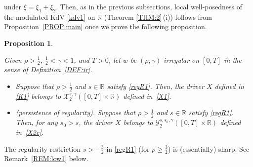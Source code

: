 \documentclass[letterpaper, 11pt,  reqno]{amsart}
\newtheorem{proposition}[theorem]{Proposition}
\newcommand{\1}{\hspace{0.5mm}\text{I}\hspace{0.5mm}}
\newcommand{\noi}{\noindent}
\newcommand{\R}{\mathbb{R}}
\newcommand{\g}{\gamma}
\newcommand{\cX}{\mathcal{X}}
\newcommand{\cY}{\mathcal{Y}}
\numberwithin{equation}{section}
\numberwithin{theorem}{section}
\begin{document}
\noi
 under $\xi = \xi_1+ \xi_2$.
Then, as in the previous subsections, 
local well-posedness of the modulated KdV \eqref{kdv1}
on $\R$
(Theorem \ref{THM:2}\,(i)) follows
from Proposition~\ref{PROP:main}
once we prove
the following proposition.



\begin{proposition}
\label{PROP:KR1}


Given $\rho > \frac 12$,  $\frac 12 < \g < 1$, and $T> 0$, 
let  $w$ be $(\rho,\g)$-irregular on $[0, T]$ in the sense of Definition~\ref{DEF:ir}.

\smallskip

\begin{itemize}
\item[(i)]
Suppose that $\rho >  \frac 12$ and $s \in \R$
satisfy 
\eqref{regR1}.
Then, 
the driver $X$ defined in \eqref{K1}
belongs to $ \cX^{s, \g}_2([0, T]\times \R)$
defined in~\eqref{X1}.

\smallskip
\item[(ii)] \textup{(persistence of regularity).}
Suppose that $\rho >  \frac 12$ and $s \in \R$
satisfy 
\eqref{regR1}.
Then, 
for any $s_0 > s$, 
the driver $X$ 
belongs to 
$\cY^{s, s_0, \g}_{2}([0, T]\times \R)$
defined in~\eqref{X2c}.




\end{itemize}






\end{proposition}


The regularity restriction $s > - \frac 32$ in \eqref{regR1}
(for $\rho \ge \frac 32$) is (essentially) sharp.
See Remark~\ref{REM:low1} below.
\end{document}
